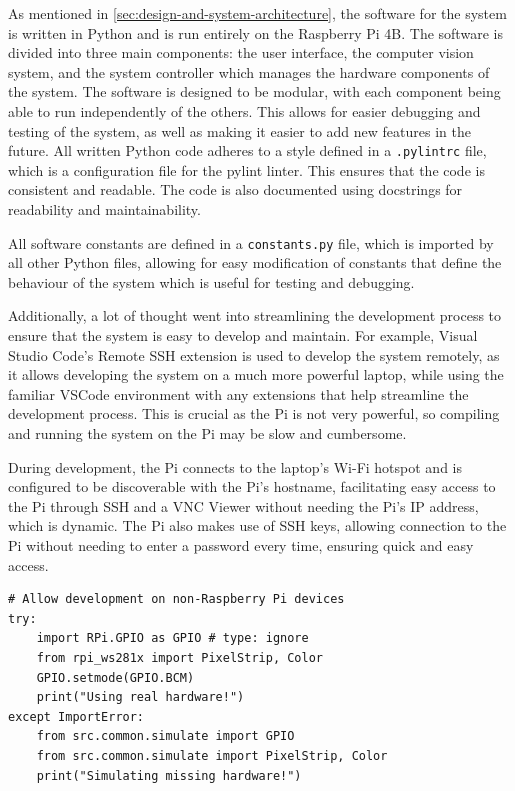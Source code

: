 As mentioned in \autoref{sec:design-and-system-architecture}, the software for the system is written in Python and is run entirely on the Raspberry Pi 4B. The software is divided into three main components: the user interface, the computer vision system, and the system controller which manages the hardware components of the system. The software is designed to be modular, with each component being able to run independently of the others. This allows for easier debugging and testing of the system, as well as making it easier to add new features in the future. All written Python code adheres to a style defined in a \texttt{.pylintrc} file, which is a configuration file for the pylint \cite{pylint} linter. This ensures that the code is consistent and readable. The code is also documented using docstrings for readability and maintainability.

All software constants are defined in a \texttt{constants.py} file, which is imported by all other Python files, allowing for easy modification of constants that define the behaviour of the system which is useful for testing and debugging.

Additionally, a lot of thought went into streamlining the development process to ensure that the system is easy to develop and maintain. For example, Visual Studio Code's \cite{vscode} Remote SSH extension is used to develop the system remotely, as it allows developing the system on a much more powerful laptop, while using the familiar VSCode environment with any extensions that help streamline the development process. This is crucial as the Pi is not very powerful, so compiling and running the system on the Pi may be slow and cumbersome.

During development, the Pi connects to the laptop's Wi-Fi hotspot and is configured to be discoverable with the Pi's hostname, facilitating easy access to the Pi through SSH and a VNC Viewer without needing the Pi's IP address, which is dynamic. The Pi also makes use of SSH keys, allowing connection to the Pi without needing to enter a password every time, ensuring quick and easy access.

\begin{minipage}[H]{\textwidth}
    \centering
    \begin{verbatim}
# Allow development on non-Raspberry Pi devices
try:
    import RPi.GPIO as GPIO # type: ignore
    from rpi_ws281x import PixelStrip, Color
    GPIO.setmode(GPIO.BCM)
    print("Using real hardware!")
except ImportError:
    from src.common.simulate import GPIO
    from src.common.simulate import PixelStrip, Color
    print("Simulating missing hardware!")
    \end{verbatim}
    \label{code:cross-platform-gpio}
\end{minipage}

